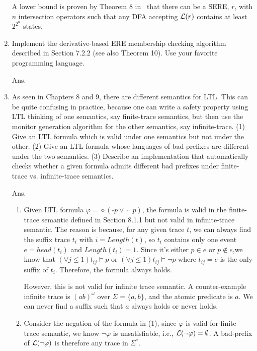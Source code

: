 \begin{enumerate}
A lower bound is proven by Theorem 8 in~\cite{GELADE20102987} that there can be
a SERE, $r$, with $n$ intersection operators such that any DFA accepting
$\mathcal{L}(r)$ contains at least $2^{2^n}$ states.


\item Implement the derivative-based ERE membership checking algorithm described
in Section 7.2.2 (see also Theorem 10). Use your favorite programming language.

Ans.

\newcommand{\G}{\ensuremath{\square}}
\newcommand{\F}{\ensuremath{\diamond}}
\newcommand{\U}{\ensuremath{\ \mathcal{U}\ }}

\item As seen in Chapters 8 and 9, there are different semantics for LTL.
This can be quite confusing in practice, because one can write a safety property
using LTL thinking of one semantics, say finite-trace semantics, but then use
the monitor generation algorithm for the other semantics, say infinite-trace.
(1) Give an LTL formula which is valid under one semantics but not under the other.
(2) Give an LTL formula whose languages of bad-prefixes are different under the
    two semantics.
(3) Describe an implementation that automatically checks whether a given formula
    admits different bad prefixes under finite-trace vs. infinite-trace semantics.

Ans.

\begin{enumerate}[(1)]
\item Given LTL formula $\varphi = \F (\G p \lor \G \neg p)$, the formula is valid in the
finite-trace semantic defined in Section 8.1.1 but not valid in infinite-trace
semantic.
The reason is because, for any given trace $t$, we can always find the suffix
trace $t_i$ with $i = Length(t)$, so $t_i$ contains only one event $e = head(t_i)$
and $Length(t_i) = 1$.
Since it's either $p \in e$ or $p \notin e$,we know that
$(\forall j \leq 1) t_{ij} \models p$ or $(\forall j \leq 1) t_{ij} \models \neg p$
where $t_{ij} = e$ is the only suffix of $t_i$.
Therefore, the formula always holds.

However, this is not valid for infinite trace semantic.
A counter-example infinite trace is $(ab)^\omega$ over $\Sigma =\{a,b\}$,
and the atomic predicate is $a$.
We can never find a suffix such that $a$ always holds or never holds.

\item Consider the negation of the formula in (1), since $\varphi$ is valid
for finite-trace semantic,
we know $\neg \varphi$ is unsatisfiable, i.e., $\mathcal{L}(\neg\varphi) = \emptyset$.
A bad-prefix of $\mathcal{L}(\neg\varphi)$ is therefore any trace in $\Sigma^*$.


\end{enumerate}
\end{enumerate}
